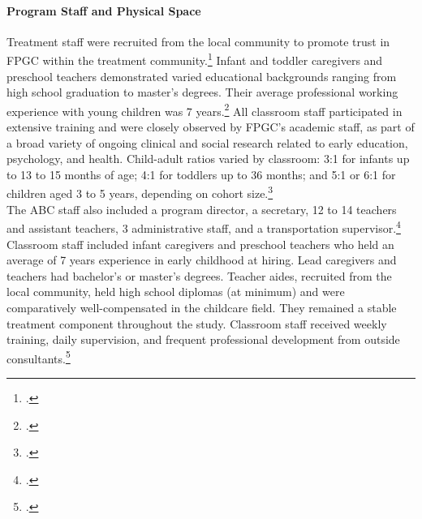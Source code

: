 \paragraph{Program Staff and Physical Space}
\noindent Treatment staff were recruited from the local community to promote trust in FPGC within the treatment community.\footnote{\citet{Ramey-et-al_1977_Intro-to-ABC,Feagans_1996_Childrens-Talk,abc2014-2015interviews}.} Infant and toddler caregivers and preschool teachers demonstrated varied educational backgrounds ranging from high school graduation to master's degrees. Their average professional working experience with young children was 7 years.\footnote{\citet{Ramey_McGinness_etal_1982_Abecedarianapproach}.} All classroom staff participated in extensive training and were closely observed by FPGC's academic staff, as part of a broad variety of ongoing clinical and social research related to early education, psychology, and health. Child-adult ratios varied by classroom: 3:1 for infants up to 13 to 15 months of age; 4:1 for toddlers up to 36 months; and 5:1 or 6:1 for children aged 3 to 5 years, depending on cohort size.\footnote{\citet{Ramey-et-al_1977_Intro-to-ABC,Ramey_Campbell_1979_SR,Ramey_McGinness_etal_1982_Abecedarianapproach}.}\\

\noindent The ABC staff also included a program director, a secretary, 12 to 14 teachers and assistant teachers, 3 administrative staff, and a transportation supervisor.\footnote{\citet{Ramey-et-al_1977_Intro-to-ABC,Ramey_McGinness_etal_1982_Abecedarianapproach}.} Classroom staff included infant caregivers and preschool teachers who held an average of 7 years experience in early childhood at hiring. Lead caregivers and teachers had bachelor's or master's degrees. Teacher aides, recruited from the local community, held high school diplomas (at minimum) and were comparatively well-compensated in the childcare field. They remained a stable treatment component throughout the study. Classroom staff received weekly training, daily supervision, and frequent professional development from outside consultants.\footnote{\citet{Obrien-Sanders_1974_ABC-brochure,Sanders-Stokes_1979_Status-Report,Klein-Sanders_1982_Status-Report,abc2014-2015interviews}.}\\

